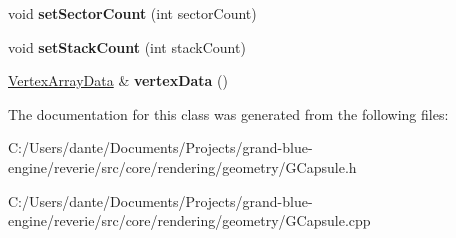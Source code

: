 \begin{DoxyCompactItemize}
\item 
\mbox{\label{classrev_1_1_capsule_a4078107a2f5d77ea940e53b7fc971eea}} 
void {\bfseries set\+Sector\+Count} (int sector\+Count)
\item 
\mbox{\label{classrev_1_1_capsule_adffd0649e7ebb42f6cfd4ea7ff1dbd73}} 
void {\bfseries set\+Stack\+Count} (int stack\+Count)
\item 
\mbox{\label{classrev_1_1_capsule_aa9c6e8b4eac8872746eb0a2f4f71cb65}} 
\mbox{\hyperlink{classrev_1_1_vertex_array_data}{Vertex\+Array\+Data}} \& {\bfseries vertex\+Data} ()
\end{DoxyCompactItemize}


The documentation for this class was generated from the following files\+:\begin{DoxyCompactItemize}
\item 
C\+:/\+Users/dante/\+Documents/\+Projects/grand-\/blue-\/engine/reverie/src/core/rendering/geometry/G\+Capsule.\+h\item 
C\+:/\+Users/dante/\+Documents/\+Projects/grand-\/blue-\/engine/reverie/src/core/rendering/geometry/G\+Capsule.\+cpp\end{DoxyCompactItemize}

